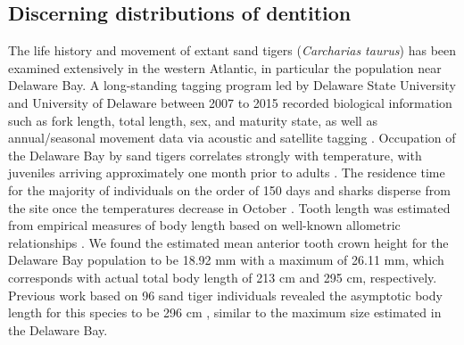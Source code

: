 \documentclass[]{rsos}%
\begin{document}
\subsection{Discerning distributions of dentition}

The life history and movement of extant sand tigers (\emph{Carcharias taurus}) has been examined extensively in the western Atlantic, in particular the population near Delaware Bay.
A long-standing tagging program led by Delaware State University and University of Delaware between 2007 to 2015 recorded biological information such as fork length, total length, sex, and maturity state, as well as annual/seasonal movement data via acoustic and satellite tagging  \cite{Teter2015, haulsee2018spatial}.
Occupation of the Delaware Bay by sand tigers correlates strongly with temperature, with juveniles arriving approximately one month prior to adults \cite{haulsee2018spatial, Teter2015}.
The residence time for the majority of individuals on the order of 150 days and sharks disperse from the site once the temperatures decrease in October \cite{haulsee2018spatial, Teter2015}.
Tooth length was estimated from empirical measures of body length based on well-known allometric relationships \cite{Shimada2004}. 
We found the estimated mean anterior tooth crown height for the Delaware Bay population to be 18.92 mm with a maximum of 26.11 mm, which corresponds with actual total body length of 213 cm and 295 cm, respectively. 
Previous work based on 96 sand tiger individuals revealed the asymptotic body length for this species to be 296 cm \cite{Goldman2006}, similar to the maximum size estimated in the Delaware Bay.
\end{document}
